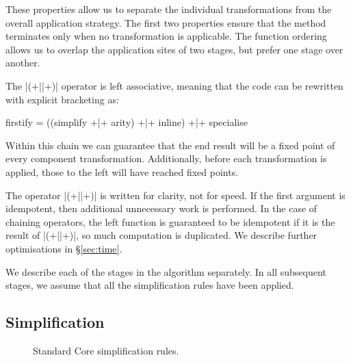 These properties allow us to separate the individual transformations from the overall application strategy. The first two properties ensure that the method terminates only when no transformation is applicable. The function ordering allows us to overlap the application sites of two stages, but prefer one stage over another.

The |(+||+)| operator is left associative, meaning that the code can be rewritten with explicit bracketing as:

\begin{code}
firstify = ((simplify +|+ arity) +|+ inline) +|+ specialise
\end{code}

Within this chain we can guarantee that the end result will be a fixed point of every component transformation. Additionally, before each transformation is applied, those to the left will have reached fixed points.

The operator |(+||+)| is written for clarity, not for speed. If the first argument is idempotent, then additional unnecessary work is performed. In the case of chaining operators, the left function is guaranteed to be idempotent if it is the result of |(+||+)|, so much computation is duplicated. We describe further optimisations in \S\ref{sec:time}.

We describe each of the stages in the algorithm separately. In all subsequent stages, we assume that all the simplification rules have been applied.


\subsection{Simplification}

\begin{figure}
\begin{simplify}


\end{simplify}
\caption{Standard Core simplification rules.}
\label{fig:simplify}
\end{figure}


